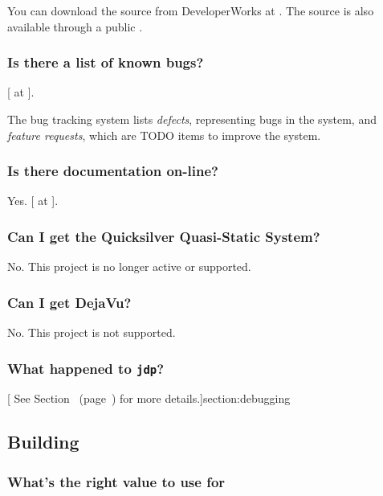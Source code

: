 You can download the \jrvm{} source from DeveloperWorks at \xlink{{\tt
\RVMDownloadURL}}{\RVMDownloadURL}.  The \jrvm{} source is also available
through a public .

\subsubsection{Is there a list of known bugs?}

[ at 
{\tt \RVMBugURL}]{\RVMBugURL}.

The bug tracking system lists {\em defects}, representing bugs in the system, and
{\em feature requests}, which are TODO items to improve the system.

\subsubsection{Is there documentation on-line?}

Yes.  [ at
{\tt \RVMHomeURL}]{\RVMHomeURL}.

\subsubsection{Can I get the Quicksilver Quasi-Static System?}

No. This project is no longer active or supported.

\subsubsection{Can I get DejaVu?}

No. This project is not supported. 

\subsubsection{What happened to {\tt jdp}?}

[ See
Section~\Ref{} (page~\Pageref) for more details.]{section:debugging}

\subsection{Building \jrvm}


\subsubsection{What's the right value to use for
 }%
\label{singleProcessorQuestion}

